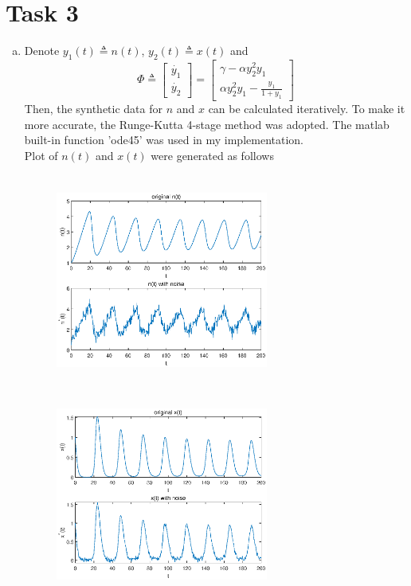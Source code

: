 \documentclass[paper=a4, fontsize=11pt]{scrartcl} %
\numberwithin{equation}{section} %
\numberwithin{figure}{section} %
\numberwithin{table}{section} %
\begin{document}
\section{Task 3}
	\begin{enumerate}[(a)]
		\item 
			Denote $y_1(t) \triangleq n(t)$, $y_2(t) \triangleq x(t)$ and
			\begin{equation}
				\Phi \triangleq
				\begin{bmatrix}
					\dot{y_1}\\
					 \dot{y_2}	
				\end{bmatrix}
				=
				\begin{bmatrix}
					\gamma - \alpha y_2^2 y_1\\
					\alpha y_2^2 y_1 - \frac{y_1}{1+y_1}
				\end{bmatrix}
			\end{equation}
			Then, the synthetic data for $n$ and $x$ can be calculated iteratively. To make it more accurate, the Runge-Kutta 4-stage method was adopted. The matlab built-in function 'ode45' was used in my implementation. \\
			Plot of $n(t)$ and $x(t)$ were generated as follows
			\begin{figure}[htbp]\centering
				\begin{minipage}{7.5cm}
					\centering
					\includegraphics[height=7cm,width=7cm]{../pic/n_and_ns.eps}
				\end{minipage}%
				\begin{minipage}{7.5cm}
					\centering
					\includegraphics[height=7cm,width=7cm]{../pic/x_and_xs.eps}
				\end{minipage}
			\end{figure}
		

\end{enumerate}
\end{document}

